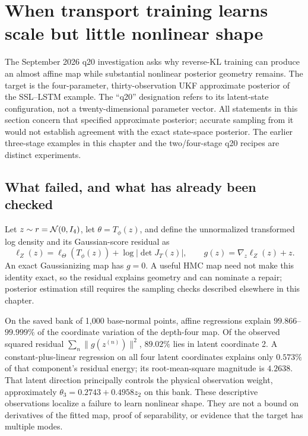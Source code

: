 \section[Weak nonlinear learning in q20]{When transport training learns scale but little nonlinear shape}
\label{sec:bf-neutra-q20-repair}

The September 2026 q20 investigation asks why reverse-KL training can produce
an almost affine map while substantial nonlinear posterior geometry remains.
The target is the four-parameter, thirty-observation UKF approximate posterior
of the SSL--LSTM example. The ``q20'' designation refers to its latent-state
configuration, not a twenty-dimensional parameter vector. All statements in
this section concern that specified approximate posterior; accurate sampling
from it would not establish agreement with the exact state-space posterior.
The earlier three-stage examples in this chapter and the two/four-stage q20
recipes are distinct experiments.

\subsection{What failed, and what has already been checked}

Let $z\sim r=\mathcal{N}(0,I_4)$, let $\theta=T_\phi(z)$, and define the
unnormalized transformed log density and its Gaussian-score residual as
\begin{equation}
 \ell_Z(z)=\ell_\Theta(T_\phi(z))+\log|\det J_T(z)|,
 \qquad g(z)=\nabla_z\ell_Z(z)+z.
 \label{eq:bf-q20-residual}
\end{equation}
An exact Gaussianizing map has $g=0$. A useful HMC map need not make this
identity exact, so the residual explains geometry and can nominate a repair;
posterior estimation still requires the sampling checks described elsewhere
in this chapter.

On the saved bank of 1,000 base-normal points, affine regressions explain
$99.866$--$99.999\%$ of the coordinate variation of the depth-four map. Of
the observed squared residual $\sum_n\|g(z^{(n)})\|^2$, $89.02\%$ lies in
latent coordinate 2. A constant-plus-linear regression on all four latent
coordinates explains only $0.573\%$ of that component's residual energy;
its root-mean-square magnitude is $4.2638$. That latent direction principally
controls the physical observation weight, approximately
$\theta_3=0.2743+0.4958z_2$ on this bank. These descriptive observations
localize a failure to learn nonlinear shape. They are not a bound on derivatives
of the fitted map, proof of separability, or evidence that the target has
multiple modes.


